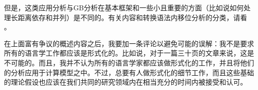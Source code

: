 但是，这类应用分析与GB分析在基本框架和一些小且重要的方面（比如说如何处理长距离依存和并列\citep{Gazdar81}）是不同的。有关内容和转换语法内移位分析的分类，请看 。

在上面富有争议的概述内容之后，我要加一条评论以避免可能的误解：我不是要求所有的语言学工作都应该是形式化的。比如说，对于一篇三十页的文章来说，这是不可能的。而且，我并不认为所有的语言学家都应该做形式化的工作，并且将他们的分析应用于计算模型之中。不过，总要有人做形式化的细节工作，而且这些基础的理论假设也应该在我们共同的研究领域内在相当充分的时间内被接受和认可。


{}

